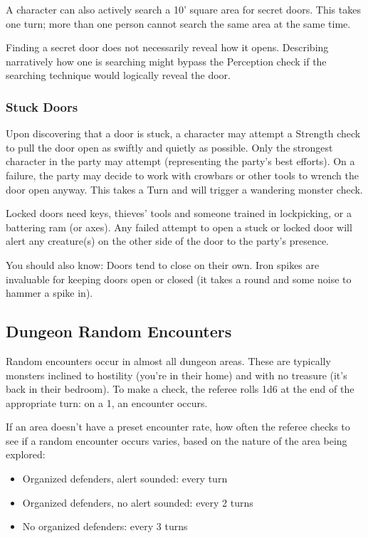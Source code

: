 \documentclass{book}
\providecommand{\tightlist}{%
\setlength{\itemsep}{0pt}\setlength{\parskip}{0pt}}
\begin{document}
A character can also actively search a 10' square area for secret doors.
This takes one turn; more than one person cannot search the same area at
the same time.

Finding a secret door does not necessarily reveal how it opens.
Describing narratively how one is searching might bypass the Perception
check if the searching technique would logically reveal the door.

\subsubsection*{Stuck Doors}\label{stuck-doors}

Upon discovering that a door is stuck, a character may attempt a
Strength check to pull the door open as swiftly and quietly as possible.
Only the strongest character in the party may attempt (representing the
party's best efforts). On a failure, the party may decide to work with
crowbars or other tools to wrench the door open anyway. This takes a
Turn and will trigger a wandering monster check.

Locked doors need keys, thieves' tools and someone trained in
lockpicking, or a battering ram (or axes). Any failed attempt to open a
stuck or locked door will alert any creature(s) on the other side of the
door to the party's presence.

You should also know: Doors tend to close on their own. Iron spikes are
invaluable for keeping doors open or closed (it takes a round and some
noise to hammer a spike in).

\newpage

\subsection*{Dungeon Random Encounters}\label{dungeon-random-encounters}

Random encounters occur in almost all dungeon areas. These are typically
monsters inclined to hostility (you're in their home) and with no
treasure (it's back in their bedroom). To make a check, the referee
rolls 1d6 at the end of the appropriate turn: on a 1, an encounter
occurs.

If an area doesn't have a preset encounter rate, how often the referee
checks to see if a random encounter occurs varies, based on the nature
of the area being explored:

\begin{itemize}
\tightlist
\item
  Organized defenders, alert sounded: every turn
\item
  Organized defenders, no alert sounded: every 2 turns
\item
  No organized defenders: every 3 turns
\end{itemize}
\end{document}
